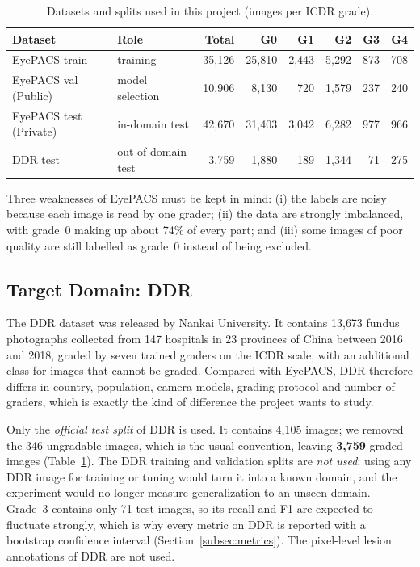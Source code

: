 \begin{table}[htbp]
    \centering
    \caption{Datasets and splits used in this project (images per ICDR grade).}
    \label{tab:data_counts}
    \small
    \begin{tabularx}{\textwidth}{l l r r r r r r}
        \toprule
        \textbf{Dataset} & \textbf{Role} & \textbf{Total} & \textbf{G0} & \textbf{G1} & \textbf{G2} & \textbf{G3} & \textbf{G4} \\
        \midrule
        EyePACS train        & training                & 35{,}126 & 25{,}810 & 2{,}443 & 5{,}292 & 873 & 708 \\
        EyePACS val (Public) & model selection         & 10{,}906 & 8{,}130  & 720     & 1{,}579 & 237 & 240 \\
        EyePACS test (Private)& in-domain test         & 42{,}670 & 31{,}403 & 3{,}042 & 6{,}282 & 977 & 966 \\
        DDR test             & out-of-domain test      & 3{,}759  & 1{,}880  & 189     & 1{,}344 & 71  & 275 \\
        \bottomrule
    \end{tabularx}
\end{table}

Three weaknesses of EyePACS must be kept in mind: (i) the labels are noisy because each image is read by one grader; (ii) the data are strongly imbalanced, with grade~0 making up about 74\% of every part; and (iii) some images of poor quality are still labelled as grade~0 instead of being excluded.

\subsection{Target Domain: DDR}
\label{subsec:ddr}

The DDR dataset \cite{ddr2019} was released by Nankai University. It contains 13{,}673 fundus photographs collected from 147 hospitals in 23 provinces of China between 2016 and 2018, graded by seven trained graders on the ICDR scale, with an additional class for images that cannot be graded. Compared with EyePACS, DDR therefore differs in country, population, camera models, grading protocol and number of graders, which is exactly the kind of difference the project wants to study.

Only the \emph{official test split} of DDR is used. It contains 4{,}105 images; we removed the 346 ungradable images, which is the usual convention, leaving \textbf{3{,}759} graded images (Table~\ref{tab:data_counts}). The DDR training and validation splits are \emph{not used}: using any DDR image for training or tuning would turn it into a known domain, and the experiment would no longer measure generalization to an unseen domain. Grade~3 contains only 71 test images, so its recall and F1 are expected to fluctuate strongly, which is why every metric on DDR is reported with a bootstrap confidence interval (Section~\ref{subsec:metrics}). The pixel-level lesion annotations of DDR are not used.


